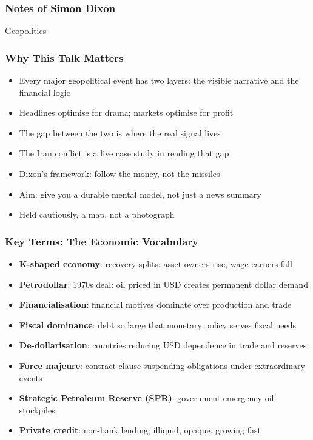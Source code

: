 \begin{frame}[fragile]\frametitle{Notes of Simon Dixon}
\begin{center}
{\Large Geopolitics}
\end{center}
\end{frame}
\begin{frame}[fragile]\frametitle{Why This Talk Matters}
  \begin{itemize}
    \item Every major geopolitical event has two layers: the visible narrative and the financial logic
    \item Headlines optimise for drama; markets optimise for profit
    \item The gap between the two is where the real signal lives
    \item The Iran conflict is a live case study in reading that gap
    \item Dixon's framework: follow the money, not the missiles
    \item Aim: give you a durable mental model, not just a news summary
    \item Held cautiously, a map, not a photograph
  \end{itemize}
\end{frame}

\begin{frame}[fragile]\frametitle{Key Terms: The Economic Vocabulary}
  \begin{itemize}
    \item \textbf{K-shaped economy}: recovery splits: asset owners rise, wage earners fall
    \item \textbf{Petrodollar}: 1970s deal: oil priced in USD creates permanent dollar demand
    \item \textbf{Financialisation}: financial motives dominate over production and trade
    \item \textbf{Fiscal dominance}: debt so large that monetary policy serves fiscal needs
    \item \textbf{De-dollarisation}: countries reducing USD dependence in trade and reserves
    \item \textbf{Force majeure}: contract clause suspending obligations under extraordinary events
    \item \textbf{Strategic Petroleum Reserve (SPR)}: government emergency oil stockpiles
    \item \textbf{Private credit}: non-bank lending; illiquid, opaque, growing fast
  \end{itemize}
\end{frame}

